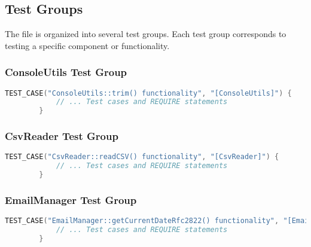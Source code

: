 \documentclass{article}
\begin{document}
	\subsection*{Test Groups}
	The file is organized into several test groups. Each test group corresponds to testing a specific component or functionality.
	
	\subsubsection*{ConsoleUtils Test Group}
	\begin{mdframed}[backgroundcolor=background, hidealllines=false, innerleftmargin=15pt, innerrightmargin=5pt, innertopmargin=-5pt, innerbottommargin=-7pt]
	\begin{lstlisting}[language=C++]
		TEST_CASE("ConsoleUtils::trim() functionality", "[ConsoleUtils]") {
			// ... Test cases and REQUIRE statements
		}
	\end{lstlisting}
	\end{mdframed}
	
	\subsubsection*{CsvReader Test Group}
	\begin{mdframed}[backgroundcolor=background, hidealllines=false, innerleftmargin=15pt, innerrightmargin=5pt, innertopmargin=-5pt, innerbottommargin=-7pt]
	\begin{lstlisting}[language=C++]
		TEST_CASE("CsvReader::readCSV() functionality", "[CsvReader]") {
			// ... Test cases and REQUIRE statements
		}
	\end{lstlisting}
	\end{mdframed}
	
	
	\subsubsection*{EmailManager Test Group}
	\begin{mdframed}[backgroundcolor=background, hidealllines=false, innerleftmargin=15pt, innerrightmargin=5pt, innertopmargin=-5pt, innerbottommargin=-7pt]
	\begin{lstlisting}[language=C++]
		TEST_CASE("EmailManager::getCurrentDateRfc2822() functionality", "[EmailManager]") {
			// ... Test cases and REQUIRE statements
		}
	\end{lstlisting}
	\end{mdframed}
	
\end{document}
